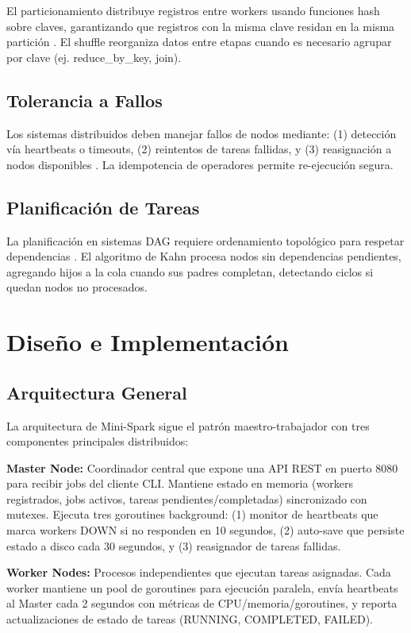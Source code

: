\documentclass[conference]{IEEEtran}
\begin{document}
El particionamiento distribuye registros entre workers usando funciones hash sobre claves, garantizando que registros con la misma clave residan en la misma partición \cite{karger1997consistent}. El shuffle reorganiza datos entre etapas cuando es necesario agrupar por clave (ej. reduce\_by\_key, join).

\subsection{Tolerancia a Fallos}

Los sistemas distribuidos deben manejar fallos de nodos mediante: (1) detección vía heartbeats o timeouts, (2) reintentos de tareas fallidas, y (3) reasignación a nodos disponibles \cite{dean2004mapreduce}. La idempotencia de operadores permite re-ejecución segura.

\subsection{Planificación de Tareas}

La planificación en sistemas DAG requiere ordenamiento topológico para respetar dependencias \cite{kahn1962topological}. El algoritmo de Kahn procesa nodos sin dependencias pendientes, agregando hijos a la cola cuando sus padres completan, detectando ciclos si quedan nodos no procesados.

\section{Diseño e Implementación}\label{sec:diseno}

\subsection{Arquitectura General}

La arquitectura de Mini-Spark sigue el patrón maestro-trabajador con tres componentes principales distribuidos:

\textbf{Master Node:} Coordinador central que expone una API REST en puerto 8080 para recibir jobs del cliente CLI. Mantiene estado en memoria (workers registrados, jobs activos, tareas pendientes/completadas) sincronizado con mutexes. Ejecuta tres goroutines background: (1) monitor de heartbeats que marca workers DOWN si no responden en 10 segundos, (2) auto-save que persiste estado a disco cada 30 segundos, y (3) reasignador de tareas fallidas.

\textbf{Worker Nodes:} Procesos independientes que ejecutan tareas asignadas. Cada worker mantiene un pool de goroutines para ejecución paralela, envía heartbeats al Master cada 2 segundos con métricas de CPU/memoria/goroutines, y reporta actualizaciones de estado de tareas (RUNNING, COMPLETED, FAILED).
\end{document}
